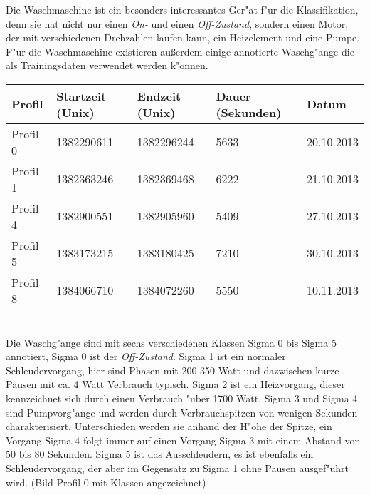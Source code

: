 Die Waschmaschine ist ein besonders interessantes Ger"at f"ur die Klassifikation, denn sie hat nicht nur einen \textit{On-} und einen \textit{Off-Zustand}, sondern einen Motor, der mit verschiedenen Drehzahlen laufen kann, ein Heizelement und eine Pumpe. F"ur die Waschmaschine existieren au{\ss}erdem einige annotierte Waschg"ange die als Trainingsdaten verwendet werden k"onnen.\\
\begin{table}[h]
\begin{tabular}{l|l|l|l|l}
Profil & Startzeit (Unix) & Endzeit (Unix) & Dauer (Sekunden) & Datum \\
\hline
Profil 0 & 1382290611 & 1382296244 & 5633 & 20.10.2013 \\
Profil 1 & 1382363246 & 1382369468 & 6222 & 21.10.2013 \\
Profil 4 & 1382900551 & 1382905960 & 5409 & 27.10.2013 \\
Profil 5 & 1383173215 & 1383180425 & 7210 & 30.10.2013 \\
Profil 8 & 1384066710 & 1384072260 & 5550 & 10.11.2013
\end{tabular}
\end{table}\\
Die Waschg"ange sind mit sechs verschiedenen Klassen Sigma 0 bis Sigma 5 annotiert, Sigma 0 ist der \textit{Off-Zustand}. Sigma 1 ist ein normaler Schleudervorgang, hier sind Phasen mit 200-350 Watt und dazwischen kurze Pausen mit ca. 4 Watt Verbrauch typisch.
Sigma 2 ist ein Heizvorgang, dieser kennzeichnet sich durch einen Verbrauch "uber 1700 Watt.
Sigma 3 und Sigma 4 sind Pumpvorg"ange und werden durch Verbrauchspitzen von wenigen Sekunden charakterisiert. Unterschieden werden sie anhand der H"ohe der Spitze, ein Vorgang Sigma 4 folgt immer auf einen Vorgang Sigma 3 mit einem Abstand von 50 bis 80 Sekunden.
Sigma 5 ist das Ausschleudern, es ist ebenfalls ein Schleudervorgang, der aber im Gegensatz zu Sigma 1 ohne Pausen ausgef"uhrt wird. (Bild Profil 0 mit Klassen angezeichnet)

